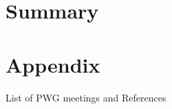 \documentclass[ALICE,manyauthors]{ALICE_analysis_notes}
\begin{document}
\section{Summary}
\section{Appendix}
List of PWG meetings and References
%


\end{document}
